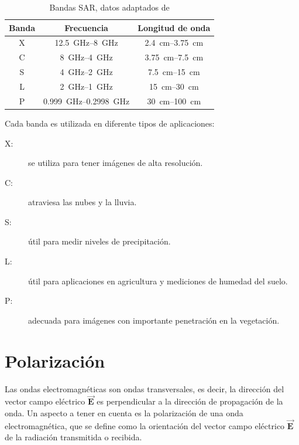 \begin{table}[H]
	\centering
	\begin{tabular}{ccc}
	\toprule
	\textbf{Banda}	& \textbf{Frecuencia}									& \textbf{Longitud de onda} \\ \midrule
		X			& \SIrange[range-units = single]{12.5}{8}{\GHz}			& \SIrange[range-units = single]{2.4}{3.75}{\cm} \\
		C			& \SIrange[range-units = single]{8}{4}{\GHz} 			& \SIrange[range-units = single]{3.75}{7.5}{\cm}\\
		S			& \SIrange[range-units = single]{4}{2}{\GHz}			& \SIrange[range-units = single]{7.5}{15}{\cm} \\
		L			& \SIrange[range-units = single]{2}{1}{\GHz}			& \SIrange[range-units = single]{15}{30}{\cm} \\
		P			& \SIrange[range-units = single]{0.999}{0.2998}{\GHz}	& \SIrange[range-units = single]{30}{100}{\cm} \\
	\bottomrule
	\end{tabular}
	\caption{\label{Bandas}Bandas SAR, datos adaptados de \citet{Sarmap2009}}
\end{table}

Cada banda es utilizada en diferente tipos de aplicaciones:

\begin{description}
\item[X:] se utiliza para tener imágenes de alta resolución.
\item[C:] atraviesa las nubes y la lluvia.
\item[S:] útil para medir niveles de precipitación.
\item[L:] útil para aplicaciones en agricultura y mediciones de humedad del suelo.
\item[P:] adecuada para  imágenes con importante penetración en la vegetación.
\end{description}


\section{Polarización}
\label{polarización}

Las ondas electromagnéticas son ondas transversales, es decir, la dirección del vector campo eléctrico $\vec{\mathbf{E}}$ es perpendicular a la dirección de propagación de la onda. 
Un aspecto a tener en cuenta es la polarización de una onda electromagnética, que se define como la orientación del vector campo eléctrico $\vec{\mathbf{E}}$ de la radiación transmitida o recibida. 

